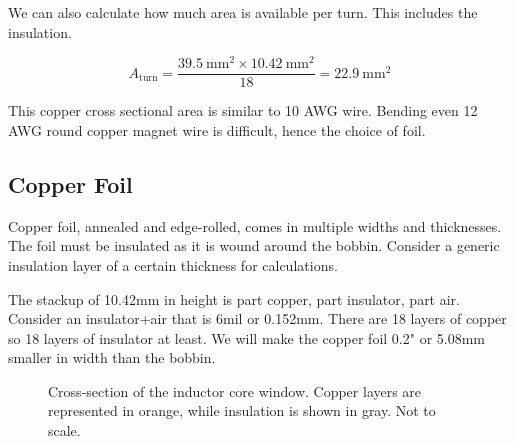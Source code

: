 \documentclass{article}
\begin{document}
We can also calculate how much area is available per turn.  This includes the insulation.

\begin{equation}
    A_\text{turn} = \frac{\SI{39.5}{\milli\meter\squared} \times \SI{10.42}{\milli\meter\squared}}{\num{18}} = \SI{22.9}{\milli\meter\squared}
\end{equation}

This copper cross sectional area is similar to 10 AWG wire.  Bending even 12 AWG round copper magnet wire is difficult, hence the choice of foil.

\subsection{Copper Foil}
Copper foil, annealed and edge-rolled, comes in multiple widths and thicknesses.
The foil must be insulated as it is wound around the bobbin.  Consider a generic insulation layer of a certain thickness for calculations.

The stackup of 10.42mm in height is part copper, part insulator, part air.  Consider an insulator+air that is 6mil or 0.152mm.  There are 18 layers of copper so 18 layers of insulator at least.  We will make the copper foil 0.2" or 5.08mm smaller in width than the bobbin. \\

\begin{figure}[H]
    \centering
{}
\caption{Cross-section of the inductor core window. Copper layers are represented in orange, while insulation is shown in gray.  Not to scale.}
    \label{fig:core_window}
\end{figure}
\end{document}
